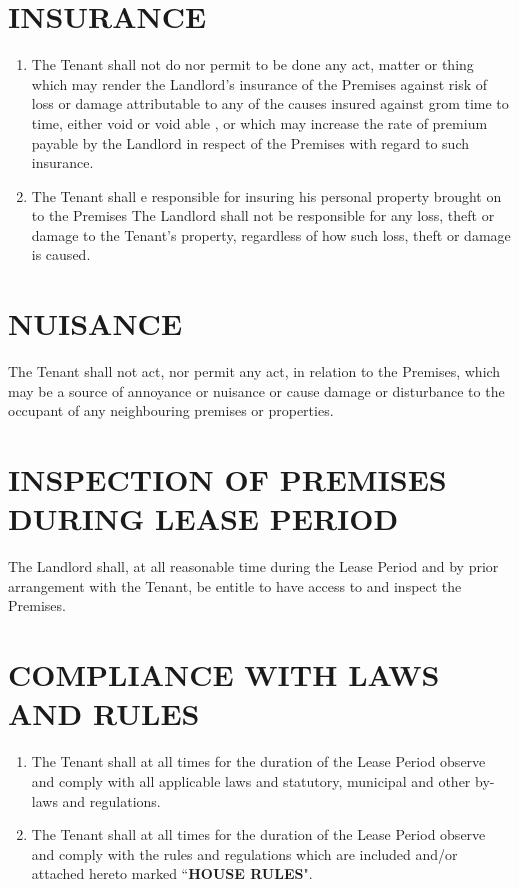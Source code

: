 \documentclass[11pt]{article}
\begin{document}
\section{\uppercase{insurance}}
\label{sec:insurance}

\begin{enumerate}
	\item The Tenant shall not do nor permit to be done any act, matter or thing which may render the Landlord's insurance of the Premises against risk of loss or damage attributable to any of the causes insured against grom time to time, either void or void able , or which may increase the rate of premium payable by the Landlord in respect of the Premises with regard to such insurance.
	\item The Tenant shall e responsible for insuring his personal property brought on to the Premises The Landlord shall not be responsible for any loss, theft or damage to the Tenant's property, regardless of how such loss, theft or damage is caused.
\end{enumerate}

\section{\uppercase{nuisance}}
\label{sec:nuisance}

The Tenant shall not act, nor permit any act, in relation to the Premises, which may be a source of annoyance or nuisance or cause damage or disturbance to the occupant of any neighbouring premises or properties.

\section{\uppercase{inspection of premises during lease period}}
\label{sec:inspection-during-period}

The Landlord shall, at all reasonable time during the Lease Period and by prior arrangement with the Tenant, be entitle to have access to and inspect the Premises.

\section{\uppercase{compliance with laws and rules}}
\label{sec:compliance-with-laws-and-rules}

\begin{enumerate}
	\item The Tenant shall at all times for the duration of the Lease Period observe and comply with all applicable laws and statutory, municipal and other by-laws and regulations.
	\item The Tenant shall at all times for the duration of the Lease Period observe and comply with the rules and regulations which are included and/or attached hereto marked ``\textbf{HOUSE RULES}".
\end{enumerate}
\end{document}
